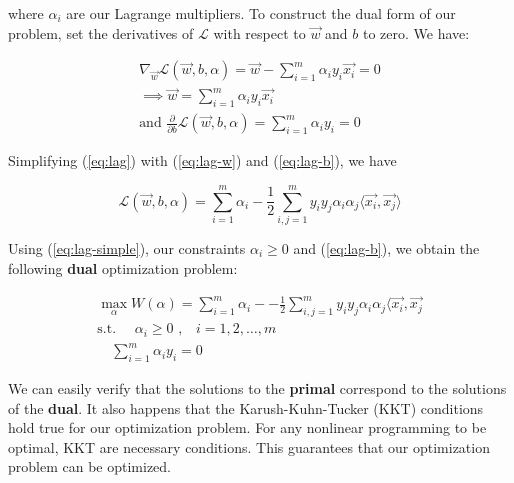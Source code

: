 where $\alpha_i$ are our Lagrange multipliers. To construct the dual form of our problem, set the derivatives of $\mathcal{L}$ with respect to $\vec{w}$ and $b$ to zero. We have:

\begin{gather}
\nabla_{\vec{w}}\mathcal{L}(\vec{w}, b, \alpha) = \vec{w} - \sum_{i = 1}^{m}\alpha_{i}y_{i}\vec{x_i} = 0 \nonumber \\
\implies \vec{w} = \sum_{i = 1}^{m}\alpha_{i}y_{i}\vec{x_i} \label{eq:lag-w}\\
\text{and } \frac{\partial}{\partial b}\mathcal{L}(\vec{w}, b, \alpha) = \sum_{i = 1}^{m}\alpha_{i}y_{i} = 0 \label{eq:lag-b}
\end{gather}

Simplifying (\ref{eq:lag}) with (\ref{eq:lag-w}) and (\ref{eq:lag-b}), we have

\begin{equation}
\mathcal{L}(\vec{w}, b, \alpha) = \sum_{i = 1}^{m}\alpha_{i} - \frac{1}{2}\sum_{i,j = 1}^{m}y_{i}y_{j}\alpha_{i}\alpha_{j}\langle\vec{x_i}, \vec{x_j}\rangle \label{eq:lag-simple}
\end{equation}

Using (\ref{eq:lag-simple}), our constraints $\alpha_{i} \geq 0$ and (\ref{eq:lag-b}), we obtain the following \textbf{dual} optimization problem:

\begin{gather}
\max_{\alpha} W(\alpha) = \sum_{i = 1}^{m}\alpha_{i} - - \frac{1}{2}\sum_{i,j = 1}^{m}y_{i}y_{j}\alpha_{i}\alpha_{j}\langle\vec{x_i}, \vec{x_j} \label{eq:dual} \\
\text{s.t. } \quad\alpha_{i} \geq 0\text{ ,}\quad\text{$i = 1, 2, \dots , m$} \label{eq:dual-c1} \\
\quad \sum_{i = 1}^{m}\alpha_{i}y_{i} = 0 \label{eq:dual-c2}
\end{gather}

We can easily verify that the solutions to the \textbf{primal} correspond to the solutions of the \textbf{dual}. It also happens that the Karush-Kuhn-Tucker (KKT) conditions hold true for our optimization problem. For any nonlinear programming to be optimal, KKT are necessary conditions. This guarantees that our optimization problem can be optimized.

